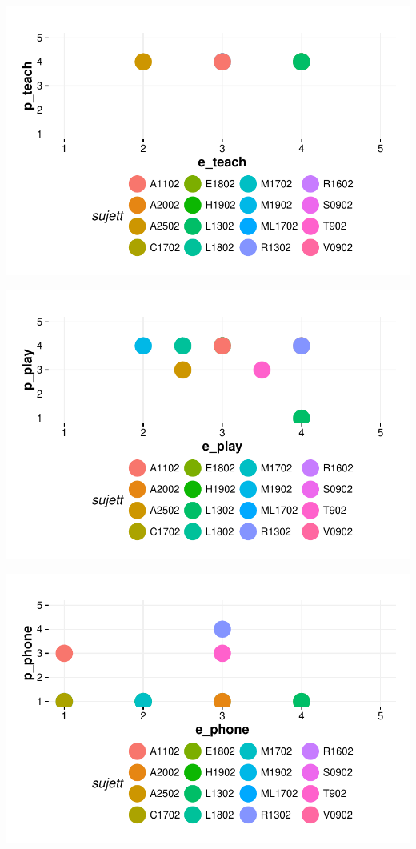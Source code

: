 \documentclass{article}
\begin{document}
\includegraphics{interviews-plot_coirs_parent_enfant_teach}

\includegraphics{interviews-plot_coirs_parent_enfant_play}

\includegraphics{interviews-plot_coirs_parent_enfant_phone}
\end{document}
